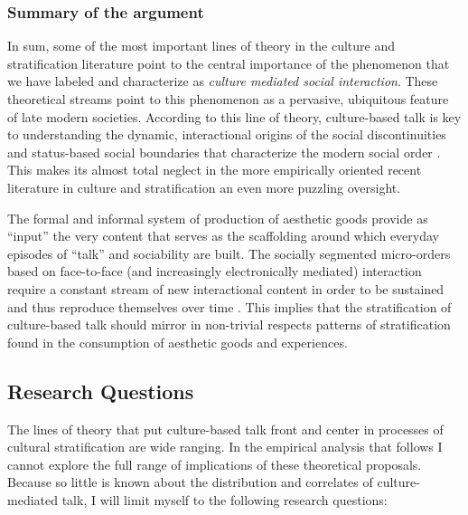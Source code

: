 \documentclass[11pt]{article}
\begin{document}
\subsubsection{Summary of the argument}
In sum, some of the most important lines of theory in the culture and stratification literature point to the central importance of the phenomenon that we have labeled and characterize as \emph{culture mediated social interaction}.  These theoretical streams point to this phenomenon as a pervasive, ubiquitous feature of late modern societies.  According to this line of theory, culture-based talk is key to understanding the dynamic, interactional origins of the social discontinuities and status-based social boundaries that characterize the modern social order \citep{illouz97}. This makes its almost total neglect in the more empirically oriented recent literature in culture and stratification an even more puzzling oversight. 

The formal and informal system of production of aesthetic goods provide as ``input'' the very content that serves as the scaffolding around which everyday episodes of ``talk'' and sociability are built.  The socially segmented micro-orders based on face-to-face (and increasingly electronically mediated) interaction require a constant stream of new interactional content in order to be sustained and thus reproduce themselves over time \citep{collins81, collins04, dimaggio87, lizardo06a}. This implies that the stratification of culture-based talk should mirror in non-trivial respects patterns of stratification found in the consumption of aesthetic goods and experiences.

\subsection{Research Questions}
The lines of theory that put culture-based talk front and center in processes of cultural stratification are wide ranging.  In the empirical analysis that follows I cannot explore the full range of implications of these theoretical proposals.  Because so little is known about the distribution and correlates of culture-mediated talk, I will limit myself to the following research questions:
\end{document}
